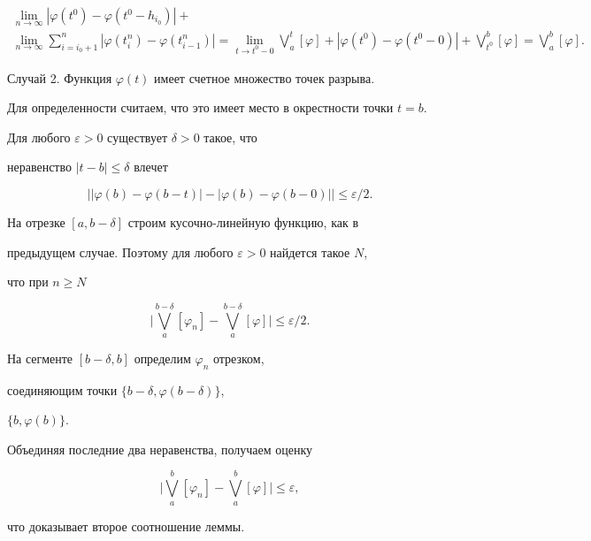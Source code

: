 \begin{pf}
\begin{multline*}
\lim_{n \to \infty}|\varphi(t^{0}) - \varphi(t^{0}-h_{i_0})| + \\


%


\lim_{n \to \infty}\sum_{i=i_0+1}^n


|\varphi(t^n_{i}) - \varphi(t^n_{i-1})|=


\lim_{t \to t^0-0}\bigvee\limits_{a}^t[ \varphi ]+


|\varphi(t^{0}) - \varphi(t^{0}-0)| +


\bigvee\limits_{t^0}^b[ \varphi]=


\bigvee\limits_{a}^b[ \varphi ].


\end{multline*}





Случай 2. Функция $\varphi(t)$ имеет счетное множество точек разрыва.


Для определенности считаем, что это имеет место в окрестности точки $t = b$.


Для любого $\varepsilon>0$ существует $\delta > 0$ такое, что


неравенство $|t-b| \le \delta$ влечет


$$


\big| |\varphi(b) - \varphi(b-t)| - |\varphi(b) - \varphi(b-0)| \big| \le


\varepsilon/2.


$$





На отрезке $[a,b-\delta]$ строим кусочно-линейную функцию, как в


предыдущем случае. Поэтому для любого $\varepsilon>0$ найдется такое $N$,


что при $n\ge N$


$$


\bigg|\bigvee\limits_a^{b-\delta}[ \varphi_n ] -


\bigvee\limits_a^{b-\delta}[ \varphi ]\bigg| \le \varepsilon/2.


$$





На сегменте $[b-\delta, b ]$ определим $\varphi_n$ отрезком,


соединяющим точки $\{b-\delta, \varphi(b-\delta) \}$,


$\{ b, \varphi(b) \}$.





Объединяя последние два неравенства, получаем оценку


$$


\bigg|\bigvee\limits_a^b[ \varphi_n ] -


\bigvee\limits_a^b[ \varphi ]\bigg| \le \varepsilon,


$$


что доказывает второе соотношение леммы.


\end{pf}





